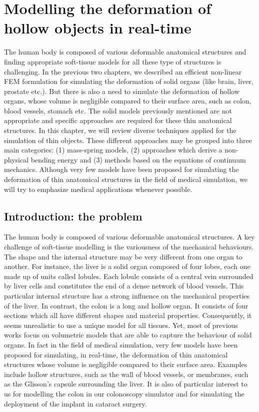 \chapter{Modelling the deformation of hollow objects in real-time}
\label{chap7}
\begin{shortAbstract}
The human body is composed of various deformable anatomical structures and finding appropriate soft-tissue models for all these type of structures is challenging. In the previous two chapters, we described an efficient non-linear FEM formulation for simulating the deformation of solid organs (like brain, liver, prostate etc.). But there is also a need to simulate the deformation of hollow organs, whose volume is negligible compared to their surface area, such as colon, blood vessels, stomach etc. The solid models previously mentioned are not appropriate and specific approaches are required for these thin anatomical structures. In this chapter, we will review diverse techniques applied for the simulation of thin objects. These different approaches may be grouped into three main categories: (1) mass-spring models, (2) approaches which derive a non-physical bending energy and (3) methods based on the equations of continuum mechanics. Although very few models have been proposed for simulating the deformation of thin anatomical structures in the field of medical simulation, we will try to emphasize medical applications whenever possible. 
\end{shortAbstract}


\section{Introduction: the problem}
The human body is composed of various deformable anatomical structures. A key challenge of soft-tissue modelling is the variousness of the mechanical behaviours. The shape and the internal structure may be very different from one organ to another. For instance, the liver is a solid organ composed of four lobes, each one made up of units called lobules. Each lobule consists of a central vein surrounded by liver cells and constitutes the end of a dense network of blood vessels. This particular internal structure has a strong influence on the mechanical properties of the liver. In contrast, the colon is a long and hollow organ. It consists of four sections which all have different shapes and material properties. Consequently, it seems unrealistic to use a unique model for all tissues. Yet, most of previous works focus on volumetric models that are able to capture the behaviour of solid organs. In fact in the field of medical simulation, very few models have been proposed for simulating, in real-time, the deformation of thin anatomical structures whose volume is negligible compared to their surface area. Examples include hollow structures, such as the wall of blood vessels, or membranes, such as the Glisson's capsule surrounding the liver. It is also of particular interest to us for modelling the colon in our colonoscopy simulator and for simulating the deployment of the implant in cataract surgery. 

